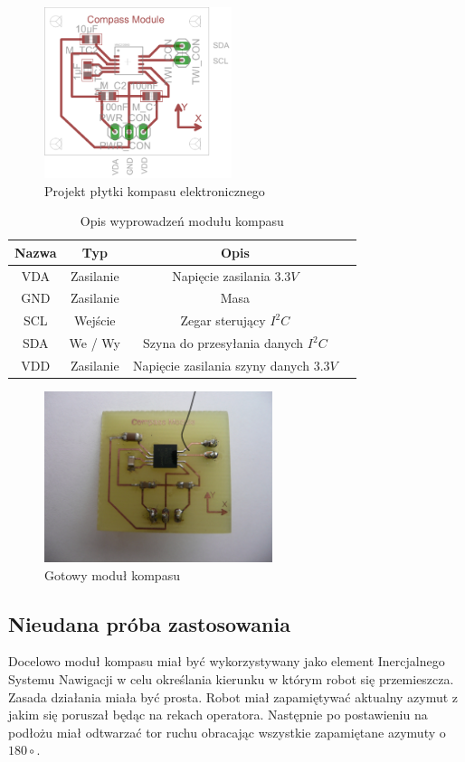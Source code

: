\begin{figure}[!ht]
 \centering
 \includegraphics[height=50mm]{../images/ch04/mmc2120mgpcb.png}
 \caption{Projekt płytki kompasu elektronicznego}
 \label{fig:MMC2120Pcb}
\end{figure}

\begin{table}[hb]
  \centering
  \caption{Opis wyprowadzeń modułu kompasu}
  \begin{tabular}{ | c | c | c | p{1.75cm} |} \hline
    Nazwa & Typ & Opis \\ \hline
    VDA & Zasilanie & Napięcie zasilania $3.3V$ \\
    GND & Zasilanie & Masa \\
    SCL & Wejście & Zegar sterujący $I^{2}C$ \\
    SDA & We / Wy & Szyna do przesyłania danych $I^{2}C$ \\
    VDD & Zasilanie & Napięcie zasilania szyny danych $3.3V$ \\ \hline
  \end{tabular}
  \label{tab:MMC2120ModOut}
\end{table}

\begin{figure}[!ht]
 \centering
 \includegraphics[height=50mm]{../images/ch04/compassmodule.jpg}
 \caption{Gotowy moduł kompasu}
 \label{fig:MMC2120Module}
\end{figure}

\subsection{Nieudana próba zastosowania}
Docelowo moduł kompasu miał być wykorzystywany jako element Inercjalnego Systemu Nawigacji w celu określania kierunku w którym robot się przemieszcza. Zasada działania miała być prosta. Robot miał zapamiętywać aktualny azymut z jakim się poruszał będąc na rekach operatora. Następnie po postawieniu na podłożu miał odtwarzać tor ruchu obracając wszystkie zapamiętane azymuty o $180\circ$. 

